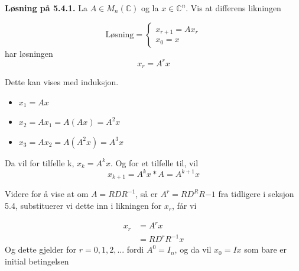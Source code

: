 \documentclass[a4paper,norsk]{article}
\newenvironment{oppgave}[1]%
	{\trivlist{}\item\relax\textbf{Løsning på #1.}\medspace}%
	{\endtrivlist}
\begin{document}
\begin{oppgave}{5.4.1}
La $ A \in M_n(\mathbb{C}) $ og la $ x \in \mathbb{C}^n $. Vis at differens likningen


\[
    \text{Løsning} = \begin{cases}
        x_{r+1} = Ax_r\\
        x_0 = x
    \end{cases}
\]
har løsningen 
\[
    x_r = A^r x
\]

Dette kan vises med induksjon. 

\begin{itemize}
    \item $ x_1 = Ax $ 
    \item $ x_2 = Ax_1 = A(Ax) = A^2x $
    \item $ x_3 = Ax_2 = A(A^2x) = A^3x $   
\end{itemize}

Da vil for tilfelle k, $ x_k = A^kx $. Og for et tilfelle til, vil 
\[
    x_{k+1} = A^k x * A = A^{k+1}x
\]




Videre for å vise at om $ A = RDR^{-1} $, så er $ A^r= RD^RR{-1} $ fra tidligere i seksjon 5.4, substituerer vi dette inn i likningen for $ x_r $, får vi

\begin{align*}
    x_r &= A^rx\\
    &= RD^rR^{-1}x
\end{align*}
Og dette gjelder for $ r=0, 1, 2,... $ fordi $ A^0=I_n $, og da vil $ x_0 = Ix $ som bare er initial betingelsen
 
\end{oppgave}
\end{document}
